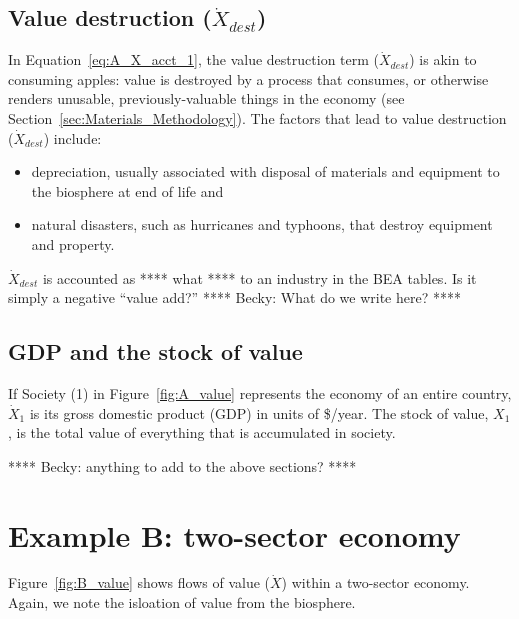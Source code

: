\subsection{Value destruction ($\dot{X}_{dest}$)}

\noindent In Equation~\ref{eq:A_X_acct_1}, 
the value destruction term ($\dot{X}_{dest}$) 
is akin to consuming apples: 
value is destroyed by a process that consumes, 
or otherwise renders unusable, 
previously-valuable things in the economy
(see Section~\ref{sec:Materials_Methodology}).
The factors that lead to value destruction
($\dot{X}_{dest}$) include:

\begin{itemize}
	\item{depreciation, usually associated with disposal of 
	materials and equipment to the biosphere at end of life and}
	\item{natural disasters, such as hurricanes and typhoons,
	that destroy equipment and property.}
\end{itemize}

$\dot{X}_{dest}$ is accounted as **** what **** to an industry in the BEA tables.
Is it simply a negative ``value add?''
**** Becky: What do we write here? ****


\subsection{GDP and the stock of value}

If Society (1) in Figure~\ref{fig:A_value} represents 
the economy of an entire country, 
$\dot{X}_{1}$ is its gross domestic product (GDP)
in units of \$/year.
The stock of value, $X_1$, is the total value of everything that 
is accumulated in society.

**** Becky: anything to add to the above sections? ****


\section{Example B: two-sector economy} %

Figure~\ref{fig:B_value} shows flows of value ($\dot{X}$) 
within a two-sector economy. 
Again, we note the isloation of value from the biosphere.


